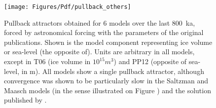 \begin{figure}
\begin{center}
\texttt{[image: Figures/Pdf/pullback\_others]}
\end{center}
\caption
{
Pullback attractors obtained for 6 models over the last 800~ka, forced by astronomical forcing with the parameters of the original publications. Shown is the model component representing ice volume or sea-level (the opposite of). Units are arbitrary in all models, except in T06 (ice volume in $10^{15}m^{3}$) and PP12 (opposite of sea-level, in m). All models show a single pullback attractor, although convergence was shown to be particularly slow in the Saltzman and Maasch models (in the sense illustrated on Figure ) and the solution  published by \cite{saltzman90sm}.  
}
\label{fig:pullback_others}
\end{figure}
